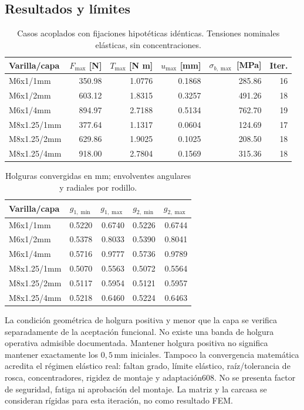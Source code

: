 \subsection{Resultados y límites}
\begin{table}[ht]\centering
\begin{tabular}{lrrrrr}\toprule
Varilla/capa&$F_{\max}$ [N]&$T_{\max}$ [N m]&$u_{\max}$ [mm]&$\sigma_{b,\max}$ [MPa]&Iter.\\\midrule
M6x1/1mm & 350.98 & 1.0776 & 0.1868 & 285.86 & 16\\
M6x1/2mm & 603.12 & 1.8315 & 0.3257 & 491.26 & 18\\
M6x1/4mm & 894.97 & 2.7188 & 0.5134 & 762.70 & 19\\
M8x1.25/1mm & 377.64 & 1.1317 & 0.0604 & 124.69 & 17\\
M8x1.25/2mm & 629.86 & 1.9025 & 0.1025 & 208.50 & 18\\
M8x1.25/4mm & 918.00 & 2.7804 & 0.1569 & 315.36 & 18\\
\bottomrule\end{tabular}
\caption{Casos acoplados con fijaciones hipotéticas idénticas. Tensiones nominales elásticas, sin concentraciones.}
\end{table}
\begin{table}[ht]\centering\begin{tabular}{lrrrr}\toprule
Varilla/capa&$g_{1,\min}$&$g_{1,\max}$&$g_{2,\min}$&$g_{2,\max}$\\\midrule
M6x1/1mm & 0.5220 & 0.6740 & 0.5226 & 0.6744\\
M6x1/2mm & 0.5378 & 0.8033 & 0.5390 & 0.8041\\
M6x1/4mm & 0.5716 & 0.9777 & 0.5736 & 0.9789\\
M8x1.25/1mm & 0.5070 & 0.5563 & 0.5072 & 0.5564\\
M8x1.25/2mm & 0.5117 & 0.5954 & 0.5121 & 0.5957\\
M8x1.25/4mm & 0.5218 & 0.6460 & 0.5224 & 0.6463\\
\bottomrule\end{tabular}\caption{Holguras convergidas en mm; envolventes angulares y radiales por rodillo.}\end{table}
La condición geométrica de holgura positiva y menor que la capa se verifica separadamente
de la aceptación funcional. No existe una banda de holgura operativa admisible documentada.
Mantener holgura positiva no significa mantener exactamente los $0,5\,\mathrm{mm}$ iniciales.
Tampoco la convergencia matemática acredita el régimen elástico real: faltan grado, límite elástico,
raíz/tolerancia de rosca, concentradores, rigidez de montaje y adaptación608.
No se presenta factor de seguridad, fatiga ni aprobación del montaje. La matriz y la carcasa
se consideran rígidas para esta iteración, no como resultado FEM.
